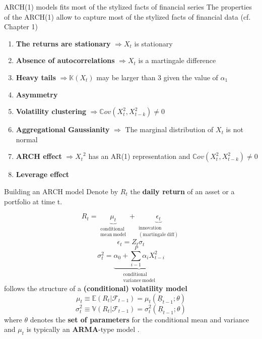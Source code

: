\documentclass{beamer}
\def\Esp{\mathbb{E}}
\def\Var{\mathbb{V}}
\def\Cov{\mathbb{C}ov}
\def\Kurt{\mathbb{K}}
\def\F{\mathcal{F}}
\newcommand{\imfbold}[1]{\textbf{\textcolor{imfblue}{#1}}}
\begin{document}
\begin{frame}{ARCH(1) models fits most of the stylized facts of financial series}
    The properties of the ARCH(1) allow to capture most of the stylized facts of financial data (cf. Chapter 1) 
    \begin{enumerate}
        \item \imfbold{The returns are stationary} $\Rightarrow {X_t}$ is stationary
        \item \imfbold{Absence of autocorrelations} $\Rightarrow {X_t}$ is a martingale difference
        \item \imfbold{Heavy tails} $\Rightarrow {\Kurt(X_t)}$ may be larger than 3 given the value of $\alpha_1$
        \item \textbf{\color{red}Asymmetry}
        \item \imfbold{Volatility clustering} $\Rightarrow {\Cov(X_t^2, X_{t-k}^2) \neq 0}$
        \item \imfbold{Aggregational Gaussianity} $\Rightarrow$ The marginal distribution of $X_t$ is not normal
        \item \imfbold{ARCH effect} $\Rightarrow {X_t}^2$ has an AR(1) representation and ${\Cov(X_t^2, X_{t-k}^2) \neq 0}$
        \item \textbf{\color{red}Leverage effect}
    \end{enumerate}
\end{frame}

\begin{frame}{Building an ARCH model}
    Denote by $R_t$ the \imfbold{daily return} of an asset or a portfolio at time t.
    
    $$R_t = \underset{\substack{\mathrm{conditional} \\ \mathrm{mean~model}}} {\underbrace{\mu_t}} + \underset{\substack{\mathrm{innovation} \\ \mathrm{(martingale~diff)} }}{\underbrace{\epsilon_t}} $$
    $$\epsilon_t = Z_t\sigma_t$$
    $$\sigma_t^2 = \underset{\substack{\mathrm{conditional} \\ \mathrm{variance~model}}} {\underbrace{\alpha_0 + \sum_{i-1}^P {\alpha_{i}X_{t-i}^2} }}$$
    follows the structure of a \textbf{(conditional) volatility model}
    $$\mu_t \equiv \Esp(R_t|\F_{t-1}) =  \mu_t(\underline{R}_{t-1};\theta) $$
    $$\sigma_t^2 \equiv \Var(R_t|\F_{t-1}) = \sigma_t^2(\underline{R}_{t-1};\theta)$$
    where $\theta$ denotes the \textbf{set of parameters} for the conditional mean and variance and $\mu_t$ is typically an \textbf{ARMA}-type model .

\end{frame}
\end{document}
